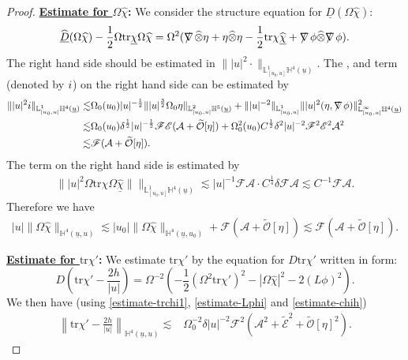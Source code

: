\documentclass[11pt,reqno]{amsart}
\theoremstyle{definition}
\numberwithin{equation}{section}
\newcommand{\tr}{\mathrm{tr}}
\renewcommand{\L}{\mathbb{L}}
\renewcommand{\H}{\mathbb{H}}
\def\chib{\underline{\chi}}
\def\chibh{\widehat{\underline{\chi}}}
\def\chih{\widehat{\chi}}
\def\tr{\mathrm{tr}}
\def\tensor{\widehat{\otimes}}
\def\ub{\underline{u}}
\newcommand{\Db}{\underline{D}}
\newcommand{\Dbh}{\widehat{\underline{D}}}
\def\nablas{\mbox{$\nabla \mkern -13mu /$ }}
\begin{document}
\begin{proof}
{\bf \underline{Estimate for $\Omega\chih$}:} We consider the structure equation for $\Db(\Omega\chih)$:
\begin{equation}\label{equ-chih}\Dbh(\Omega\chih)-\frac{1}{2}\Omega\tr\chib\Omega\chih=\Omega^2(\nablas \tensor \eta + \eta \tensor \eta -\frac{1}{2}\tr\chi \chibh+\nablas\phi\tensor\nablas\phi).\end{equation}
The right hand side should be estimated in $\||u|^2\cdot\|_{\L^1_{[u_0,u]}\H^4(\ub)}$. The ,  and  term (denoted by $\uppercase\expandafter{\romannumeral1}$) on the right hand side can be estimated by
\begin{align*}
\||u|^2\uppercase\expandafter{\romannumeral1}\|_{\L^1_{[u_0,u]}\H^4(\ub)}\lesssim&\Omega_0(u_0)|u|^{-\frac{1}{2}}\||u|^{\frac{3}{2}}\Omega_0\eta\|_{\L^2_{[u_0,u]}\H^5(\ub)}+\||u|^{-2}\|_{\L^1_{[u_0,u]}}\||u|^2(\eta,\nablas\phi)\|_{\L^\infty_{[u_0,u]}\H^4(\ub)}^2\\
\lesssim& \Omega_0(u_0)\delta^{\frac{1}{2}}|u|^{-\frac{1}{2}}\mathscr{F}\mathscr{E}(\mathcal{A}+\widetilde{\mathcal{O}}[\eta])+\Omega_0^2(u_0)C^{\frac{1}{2}}\delta^2|u|^{-2}\mathscr{F}^2\mathscr{E}^2\mathcal{A}^2\\
\lesssim& \mathscr{F}(\mathcal{A}+\widetilde{\mathcal{O}}[\eta]).
\end{align*}
The  term on the right hand side is estimated by
\begin{align*}
\||u|^2\Omega\tr\chi\Omega\chibh\|\|_{\L^1_{[u_0,u]}\H^4(\ub)}\lesssim |u|^{-1}\mathscr{F}\mathcal{A}\cdot C^{\frac{1}{4}}\delta\mathscr{F}\mathcal{A}\lesssim C^{-1}\mathscr{F}\mathcal{A}.
\end{align*}
Therefore we have
\begin{align}\label{estimate-chih}
|u|\|\Omega\chih\|_{\H^4(\ub,u)}\lesssim|u_0|\|\Omega\chih\|_{\H^4(\ub,u_0)}+\mathscr{F}(\mathcal{A}+\widetilde{\mathcal{O}}[\eta])\lesssim\mathscr{F}(\mathcal{A}+\widetilde{\mathcal{O}}[\eta]).\end{align}


{\bf \underline{Estimate for $\tr\chi'$}:} We estimate $\tr\chi'$ by the equation for $D\tr\chi'$ written in form:
\begin{equation}\label{equ-Dtrchi}D\left(\tr\chi'-\frac{2h}{|u|}\right)=\Omega^{-2}\left(-\frac{1}{2}(\Omega^2\tr\chi')^2-|\Omega\chih|^2-2(L\phi)^2\right).\end{equation}
We then have  (using \eqref{estimate-trchi1}, \eqref{estimate-Lphi} and \eqref{estimate-chih})
\begin{align}\label{estimate-trchi}
\left\|\tr\chi'-\frac{2h}{|u|}\right\|_{\H^4(\ub,u)}\lesssim&\Omega_0^{-2}\delta|u|^{-2}\mathscr{F}^2(\mathcal{A}^2+\widetilde{\mathcal{E}}^2+\widetilde{\mathcal{O}}[\eta]^2).
\end{align}




\end{proof}
\end{document}
